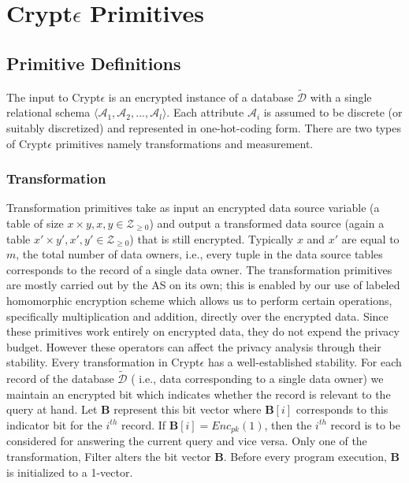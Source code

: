 \section{Crypt$\epsilon$ Primitives}
\subsection{Primitive Definitions} 
The input to Crypt$\epsilon$ is an encrypted instance of a database $\boldsymbol{\tilde{\mathcal{D}}}$ with a single relational schema $\langle \mathcal{A}_1,\mathcal{A}_2, . . . ,\mathcal{A}_l\rangle$. Each attribute $\mathcal{A}_i$ is assumed to be discrete
(or suitably discretized) and represented in one-hot-coding form. 
There are two types of Crypt$\epsilon$ primitives namely transformations and measurement.
\subsubsection{\textbf{Transformation}}
 Transformation primitives take
as input an encrypted data source variable (a table of size $x \times y, x,y \in \mathcal{Z}_{\geq 0}$) and output
a transformed data source (again  a table $x' \times y', x',y' \in \mathcal{Z}_{\geq 0}$) that is still encrypted. Typically $x$ and $x'$ are equal to $m$, the total number of data owners, i.e., every tuple in the data source tables corresponds to the record of a single data owner.
The transformation primitives are mostly carried out by the \textsf{AS} on its own; this is enabled by our use of labeled homomorphic encryption scheme which allows us to perform certain operations, specifically multiplication and addition, directly over the encrypted data. %
Since these primitives work entirely on encrypted data, they do not expend the privacy budget. However these operators can affect the privacy analysis through their stability. Every transformation in Crypt$\epsilon$ has a well-established stability.
For each record of the database $\boldsymbol{\tilde{\mathcal{D}}}$ ( i.e., data corresponding to a single data owner) we maintain an encrypted bit which indicates whether the record is relevant to the query at hand. Let $\mathbf{B}$ represent this bit vector where $\mathbf{B}[i]$ corresponds to this indicator bit for the $i^{th}$ record.  If $\mathbf{B}[i] =Enc_{pk}(1)$, then the $i^{th}$ record is to be considered for answering the current query and vice versa. Only one of the transformation, \textsf{Filter} alters the bit vector $\mathbf{B}$. Before every program execution, $\mathbf{B}$ is initialized to a 1-vector. 
